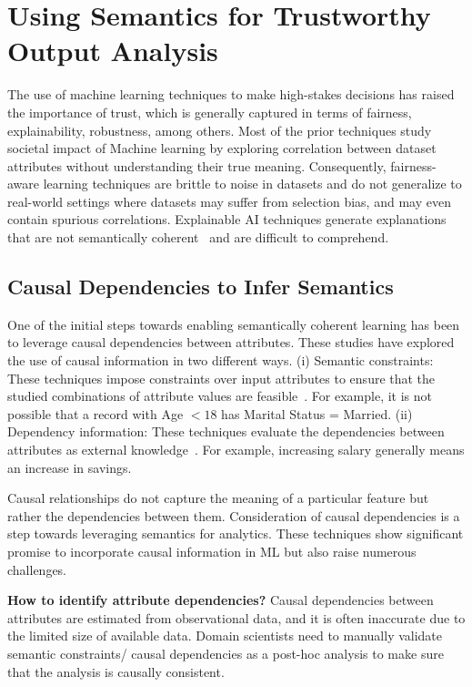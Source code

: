\documentclass[sigconf, nonacm]{acmart}
\begin{document}
\section{Using Semantics for Trustworthy Output Analysis }%
\label{trustworthy_section}
The use of machine learning techniques to make high-stakes decisions has raised the importance of trust, which is generally captured in terms of fairness, explainability, robustness, among others. Most of the prior techniques study societal impact of Machine learning by exploring correlation between dataset attributes without understanding their true meaning. 
Consequently, fairness-aware learning techniques are brittle to noise in datasets and do not generalize to real-world settings where datasets may suffer from selection bias, and may even contain spurious correlations. Explainable AI techniques generate explanations that are not semantically coherent~\cite{ustun2019actionable} and are difficult to comprehend. 

\subsection{Causal Dependencies to Infer Semantics}
One of the initial steps towards enabling semantically coherent learning has been to leverage  causal dependencies between attributes. 
These studies have explored the use of causal information in two different ways. (i) Semantic constraints: These techniques impose constraints over input attributes to ensure that the studied combinations of attribute values are feasible~\cite{mothilal2020explaining}. For example, it is not possible that a record with Age $<18$ has Marital Status = Married.
(ii) Dependency information: These techniques evaluate the dependencies between attributes as external knowledge~\cite{karimi2020model,galhotra2021explaining}. For example, increasing salary generally means an increase in savings. 


Causal relationships do not capture the meaning of a particular feature but rather the dependencies between them. Consideration of causal dependencies is a step towards leveraging semantics for analytics. 
These techniques show significant promise to incorporate causal information in ML but also raise numerous challenges. 

\noindent \textbf{How to identify attribute dependencies?} Causal dependencies between attributes are estimated from observational data, and it is often inaccurate due to the limited size of available data. Domain scientists need to manually validate semantic constraints/ causal dependencies as a post-hoc analysis to make sure that the analysis is causally consistent.
\end{document}

